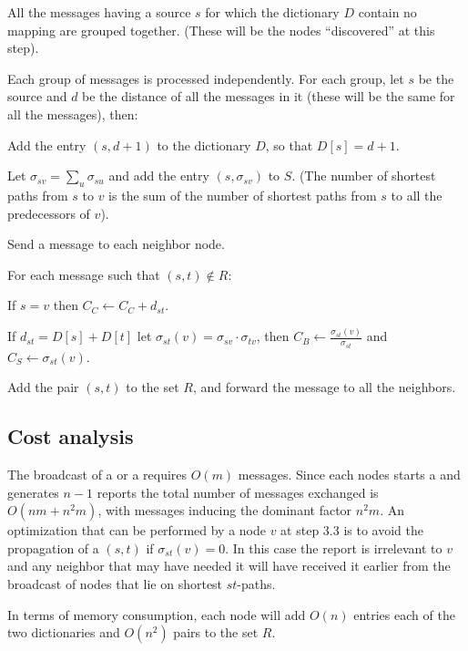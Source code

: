 \begin{algosteps}

  \item All the \mdisc{} messages having a source $s$ for which the dictionary $D$ contain no mapping are grouped together. (These will be the nodes ``discovered'' at this step).

  \item Each group of messages is processed independently. For each group, let $s$ be the source and $d$ be the distance of all the  messages in it (these will be the same for all the messages), then:
  \begin{algosteps}
    \item Add the entry $(s,d+1)$ to the dictionary $D$, so that $D[s] = d+1$.
    \item Let $\sigma_{sv} = \sum_{u} \sigma_{su}$ and add the entry $(s,\sigma_{sv})$ to  $S$. (The number of shortest paths from $s$ to $v$ is the sum of the number of shortest paths from $s$ to all the predecessors of $v$).
    \item Send a  message to each neighbor node.
  \end{algosteps}
  
  \item For each  message such that $(s,t) \notin R$:
  \begin{algosteps}
    \item If $s = v$ then $C_C \gets C_C + d_{st}$.
    \item If $d_{st} = D[s]+D[t]$ let $\sigma_{st}(v) = \sigma_{sv} \cdot \sigma_{tv}$, then $C_B \gets \frac{\sigma_{st}(v)}{\sigma_{st}}$ and $C_S \gets \sigma_{st}(v)$.
    \item Add the pair $(s,t)$ to the set $R$, and forward the \mrep{} message to all the neighbors. \label{step:deccen:report}
  \end{algosteps}
\end{algosteps}

\subsection{Cost analysis}
The broadcast of a \mdisc{} or a \mrep{} requires $O(m)$ messages. Since each nodes starts a \mdisc{} and generates $n-1$ reports the total number of messages exchanged is $O(nm + n^2m)$, with \mrep{} messages inducing the dominant factor $n^2m$. An optimization that can be performed by a node $v$ at step 3.3 is to avoid the propagation of a $(s,t)$ \mrep{} if $\sigma_{st}(v) = 0$. In this case the report is irrelevant to $v$ and any neighbor that may have needed it will have received it earlier from the broadcast of nodes that lie on shortest $st$-paths.

In terms of memory consumption, each node will add $O(n)$ entries each of the two dictionaries and $O(n^2)$ pairs to the set $R$.
